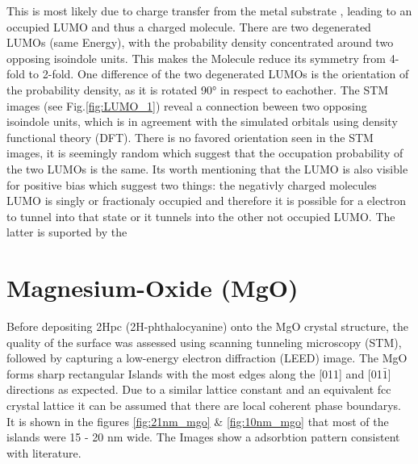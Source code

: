 \noindent This is most likely due to charge transfer from the metal substrate , leading to an occupied LUMO and thus a charged molecule.  
There are two degenerated LUMOs (same Energy), with the probability density concentrated around two opposing isoindole units. 
This makes the Molecule reduce its symmetry from 4-fold to 2-fold.
One difference of the two degenerated LUMOs is the orientation of the probability density, as it is rotated 90° in respect to eachother.
The STM images (see Fig.\ref{fig:LUMO_1}) reveal a connection beween two opposing isoindole units, which is in agreement  with the simulated orbitals using density functional theory (DFT).  
There is no favored orientation seen in the STM images, it is seemingly random which suggest that the occupation probability of the two LUMOs is the same. 
Its worth mentioning that the LUMO is also visible for positive bias which suggest two things: the negativly charged molecules LUMO is singly or fractionaly occupied and therefore it is possible for a electron to tunnel into that state or it tunnels into the other not occupied LUMO. The latter is suported by the 

\section{Magnesium-Oxide (MgO)}
Before depositing 2Hpc (2H-phthalocyanine) onto the MgO crystal structure, the quality of the surface was assessed using scanning tunneling microscopy (STM), followed by capturing a low-energy electron diffraction (LEED) image.
The MgO forms sharp rectangular Islands with the most edges along the [011] and [01$\bar{1}$] directions as expected.
Due to a similar lattice constant and an equivalent fcc crystal lattice it can be assumed that there are local coherent phase boundarys.
It is shown in the figures \ref{fig:21nm_mgo} \& \ref{fig:10nm_mgo} that most of the islands were 15 - 20 nm wide.
The Images show a adsorbtion pattern consistent with literature. 
